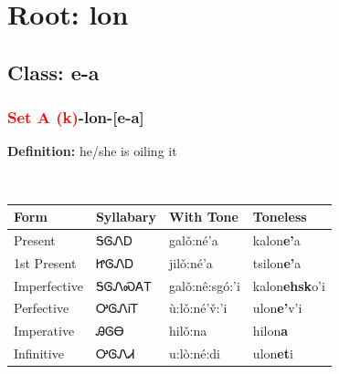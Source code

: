 \needspace{4in}
\section*{Root: lon}
\nopagebreak
{}
\needspace{3in}
\subsection*{Class: e-a}
\nopagebreak
\needspace{2in}
\subsubsection*{\textcolor{Red}{Set A (k)}{-}\textbf{lon}{-}[e-a]}
\nopagebreak
\textbf{Definition: } he/she is oiling it
\\[0.5em]
\begin{tabularx}{\textwidth}{l X X X}%
\toprule%
\textbf{Form}&\textbf{Syllabary}&\textbf{With Tone}&\textbf{Toneless}\\%
\midrule%
Present&ᎦᎶᏁᎠ&galǒ:né’a&kalon\textbf{e'}a\\%
1st Present&ᏥᎶᏁᎠ&jilǒ:né’a&tsilon\textbf{e'}a\\%
Imperfective&ᎦᎶᏁᏍᎪᎢ&galǒ:nê:sgó:’i&kalon\textbf{ehsk}o'i\\%
Perfective&ᎤᎶᏁᎥᎢ&ù:lǒ:né’v̌:’i&ulon\textbf{e'}v'i\\%
Imperative&ᎯᎶᎾ&hilǒ:na&hilon\textbf{a}\\%
Infinitive&ᎤᎶᏁᏗ&u:lò:né:di&ulon\textbf{et}i\\%
\bottomrule%
\end{tabularx}
\\[1em]
